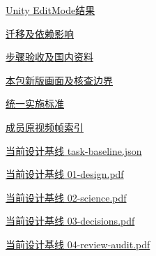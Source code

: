 \documentclass[11pt,a4paper]{article}
\begin{document}
\href{file:///D:/Agent/srp/agent/tasks/U-05/evidence/editmode-results.xml}{Unity EditMode结果}


\href{file:///D:/Agent/srp/agent/tasks/U-05/evidence/consumer-impact.md}{迁移及依赖影响}


\href{file:///D:/Agent/srp/agent/tasks/U-05/TASK.md}{步骤验收及国内资料}


\href{file:///D:/Agent/srp/agent/tasks/U-05/outputs/current-implementation-evidence.md}{本包新版画面及核查边界}


\href{file:///D:/Agent/srp/agent/design/weather/2026-10-08_Storm\%E4\%B8\%8E\%E7\%BA\%AF\%E7\%B2\%92\%E5\%AD\%90\%E5\%8F\%8C\%E7\%8E\%AF\%E5\%AE\%9E\%E6\%96\%BD\%E6\%A0\%87\%E5\%87\%86.md}{统一实施标准}


\href{file:///D:/Agent/srp/human/assets/previews/2026-10-08/member-storm-particle-rings/frame-index.json}{成员原视频帧索引}


\href{file:///D:/Agent/srp/agent/design/design-foundation-20261008/task-baseline.json}{当前设计基线 task-\allowbreak{}baseline.json}


\href{file:///D:/Agent/srp/agent/design/design-foundation-20261008/01-design.pdf}{当前设计基线 01-\allowbreak{}design.pdf}


\href{file:///D:/Agent/srp/agent/design/design-foundation-20261008/02-science.pdf}{当前设计基线 02-\allowbreak{}science.pdf}


\href{file:///D:/Agent/srp/agent/design/design-foundation-20261008/03-decisions.pdf}{当前设计基线 03-\allowbreak{}decisions.pdf}


\href{file:///D:/Agent/srp/agent/design/design-foundation-20261008/04-review-audit.pdf}{当前设计基线 04-\allowbreak{}review-\allowbreak{}audit.pdf}
\end{document}
